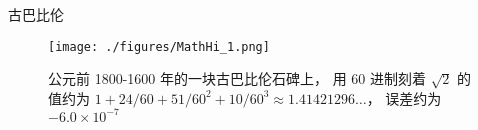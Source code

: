 
古巴比伦
\begin{figure}[ht]
\centering
\texttt{[image: ./figures/MathHi\_1.png]}
\caption{公元前 1800-1600 年的一块古巴比伦石碑上， 用 60 进制刻着 $\sqrt{2}$ 的值约为 $1 + 24/60 + 51/60^2 + 10/60^3 \approx 1.41421296\dots$， 误差约为 $-6.0\times10^{-7}$} \label{MathHi_fig1}
\end{figure}
